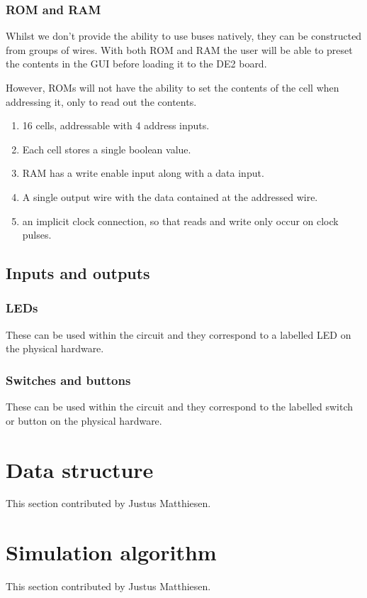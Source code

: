 \documentclass[12pt, a4paper, oneside,titlepage]{article}
\begin{document}
\subsubsection{ROM and RAM}
Whilst we don't provide the ability to use buses natively, they can be constructed from groups of wires. With both ROM and RAM the user will be able to preset the contents in the GUI before loading it to the DE2 board. 

However, ROMs will not have the ability to set the contents of the cell when addressing it, only to read out the contents. 

\begin{enumerate}
\item 16 cells, addressable with 4 address inputs.
\item Each cell stores a single boolean value. 
\item RAM has a write enable input along with a data input.
\item A single output wire with the data contained at the addressed wire. 
\item an implicit clock connection, so that reads and write only occur on clock pulses.
\end{enumerate}

\subsection{Inputs and outputs}
\subsubsection{LEDs}
These can be used within the circuit and they correspond to a labelled LED on the physical hardware.
\subsubsection{Switches and buttons}
These can be used within the circuit and they correspond to the labelled switch or button on the physical hardware. 

\section{Data structure}
This section contributed by Justus Matthiesen.

\section{Simulation algorithm}
This section contributed by Justus Matthiesen. 
\end{document}
